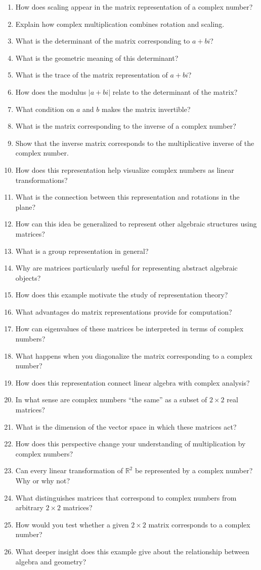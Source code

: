 \begin{enumerate}
  \item How does scaling appear in the matrix representation of a complex number?
  \item Explain how complex multiplication combines rotation and scaling.
  \item What is the determinant of the matrix corresponding to $a + bi$?
  \item What is the geometric meaning of this determinant?
  \item What is the trace of the matrix representation of $a + bi$?
  \item How does the modulus $|a+bi|$ relate to the determinant of the matrix?
  \item What condition on $a$ and $b$ makes the matrix invertible?
  \item What is the matrix corresponding to the inverse of a complex number?
  \item Show that the inverse matrix corresponds to the multiplicative inverse of the complex number.
  \item How does this representation help visualize complex numbers as linear transformations?
  \item What is the connection between this representation and rotations in the plane?
  \item How can this idea be generalized to represent other algebraic structures using matrices?
  \item What is a group representation in general?
  \item Why are matrices particularly useful for representing abstract algebraic objects?
  \item How does this example motivate the study of representation theory?
  \item What advantages do matrix representations provide for computation?
  \item How can eigenvalues of these matrices be interpreted in terms of complex numbers?
  \item What happens when you diagonalize the matrix corresponding to a complex number?
  \item How does this representation connect linear algebra with complex analysis?
  \item In what sense are complex numbers ``the same'' as a subset of $2 \times 2$ real matrices?
  \item What is the dimension of the vector space in which these matrices act?
  \item How does this perspective change your understanding of multiplication by complex numbers?
  \item Can every linear transformation of $\mathbb{R}^2$ be represented by a complex number? Why or why not?
  \item What distinguishes matrices that correspond to complex numbers from arbitrary $2 \times 2$ matrices?
  \item How would you test whether a given $2 \times 2$ matrix corresponds to a complex number?
  \item What deeper insight does this example give about the relationship between algebra and geometry?
\end{enumerate}
